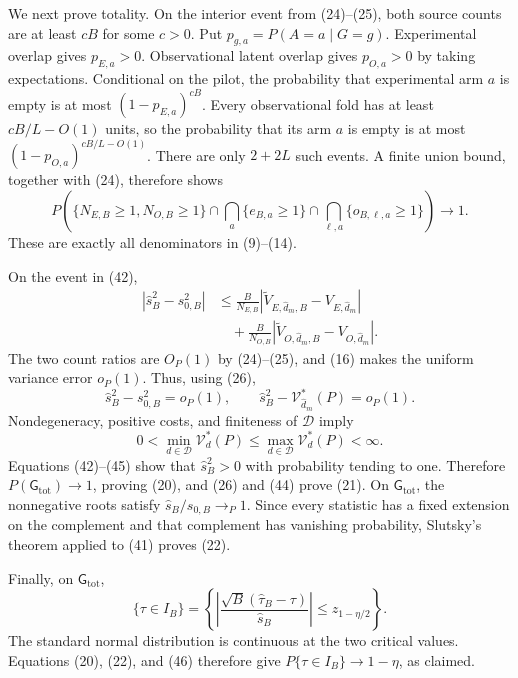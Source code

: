 We next prove totality.  On the interior event from (24)--(25), both source counts are at least \(cB\) for some \(c>0\).  Put \(p_{g,a}=P(A=a\mid G=g)\).  Experimental overlap gives \(p_{E,a}>0\).  Observational latent overlap gives \(p_{O,a}>0\) by taking expectations.  Conditional on the pilot, the probability that experimental arm \(a\) is empty is at most \((1-p_{E,a})^{cB}\).  Every observational fold has at least \(cB/L-O(1)\) units, so the probability that its arm \(a\) is empty is at most \((1-p_{O,a})^{cB/L-O(1)}\).  There are only \(2+2L\) such events.  A finite union bound, together with (24), therefore shows
\[
 P\left(
 \{N_{E,B}\ge1,N_{O,B}\ge1\}
 \cap\bigcap_a\{e_{B,a}\ge1\}
 \cap\bigcap_{\ell,a}\{o_{B,\ell,a}\ge1\}
 \right)\longrightarrow1.                                  \tag{42}
\]
These are exactly all denominators in (9)--(14).

On the event in (42),
\[
\begin{aligned}
 |\widehat s_B^2-s_{0,B}^2|
 &\le\frac{B}{N_{E,B}}
 |\widetilde V_{E,\widehat d_m,B}-V_{E,\widehat d_m}|\\
 &\quad+\frac{B}{N_{O,B}}
 |\widetilde V_{O,\widehat d_m,B}-V_{O,\widehat d_m}|.
\end{aligned}                                                \tag{43}
\]
The two count ratios are \(O_P(1)\) by (24)--(25), and (16) makes the uniform variance error \(o_P(1)\).  Thus, using (26),
\[
 \widehat s_B^2-s_{0,B}^2=o_P(1),
 \qquad
 \widehat s_B^2-\mathcal V_{\widehat d_m}^*(P)=o_P(1).      \tag{44}
\]
Nondegeneracy, positive costs, and finiteness of \(\mathcal D\) imply
\[
 0<\min_{d\in\mathcal D}\mathcal V_d^*(P)
 \le\max_{d\in\mathcal D}\mathcal V_d^*(P)<\infty.        \tag{45}
\]
Equations (42)--(45) show that \(\widehat s_B^2>0\) with probability tending to one.  Therefore \(P(\mathsf G_{\mathrm{tot}})\to1\), proving (20), and (26) and (44) prove (21).  On \(\mathsf G_{\mathrm{tot}}\), the nonnegative roots satisfy \(\widehat s_B/s_{0,B}\to_P1\).  Since every statistic has a fixed extension on the complement and that complement has vanishing probability, Slutsky's theorem applied to (41) proves (22).

Finally, on \(\mathsf G_{\mathrm{tot}}\),
\[
 \{\tau\in I_B\}
 =\left\{\left|
 \frac{\sqrt B(\widehat\tau_B-\tau)}{\widehat s_B}
 \right|\le z_{1-\eta/2}\right\}.                          \tag{46}
\]
The standard normal distribution is continuous at the two critical values.  Equations (20), (22), and (46) therefore give \(P\{\tau\in I_B\}\to1-\eta\), as claimed.
